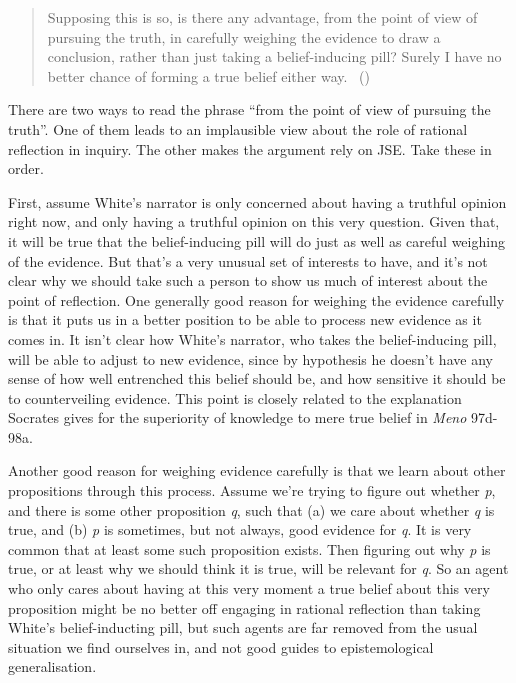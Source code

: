 \documentclass[
  10pt,
  letterpaper,
  twoside]{scrbook}
\begin{document}
\begin{quote}
Supposing this is so, is there any advantage, from the point of view of
pursuing the truth, in carefully weighing the evidence to draw a
conclusion, rather than just taking a belief-inducing pill? Surely I
have no better chance of forming a true belief either way.
~()
\end{quote}

There are two ways to read the phrase ``from the point of view of
pursuing the truth''. One of them leads to an implausible view about the
role of rational reflection in inquiry. The other makes the argument
rely on JSE. Take these in order.

First, assume White's narrator is only concerned about having a truthful
opinion right now, and only having a truthful opinion on this very
question. Given that, it will be true that the belief-inducing pill will
do just as well as careful weighing of the evidence. But that's a very
unusual set of interests to have, and it's not clear why we should take
such a person to show us much of interest about the point of reflection.
One generally good reason for weighing the evidence carefully is that it
puts us in a better position to be able to process new evidence as it
comes in. It isn't clear how White's narrator, who takes the
belief-inducing pill, will be able to adjust to new evidence, since by
hypothesis he doesn't have any sense of how well entrenched this belief
should be, and how sensitive it should be to counterveiling evidence.
This point is closely related to the explanation Socrates gives for the
superiority of knowledge to mere true belief in \emph{Meno} 97d-98a.

Another good reason for weighing evidence carefully is that we learn
about other propositions through this process. Assume we're trying to
figure out whether \emph{p}, and there is some other proposition
\emph{q}, such that (a) we care about whether \emph{q} is true, and (b)
\emph{p} is sometimes, but not always, good evidence for \emph{q}. It is
very common that at least some such proposition exists. Then figuring
out why \emph{p} is true, or at least why we should think it is true,
will be relevant for \emph{q}. So an agent who only cares about having
at this very moment a true belief about this very proposition might be
no better off engaging in rational reflection than taking White's
belief-inducting pill, but such agents are far removed from the usual
situation we find ourselves in, and not good guides to epistemological
generalisation.
\end{document}
